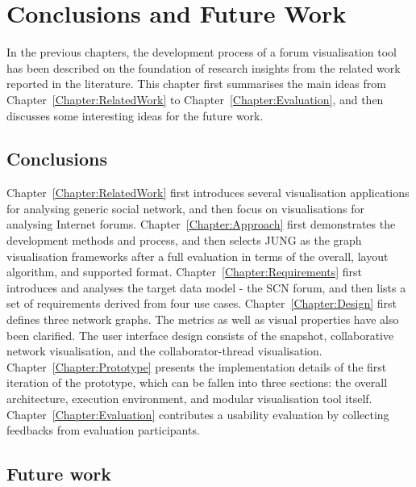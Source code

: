 \chapter{Conclusions and Future Work} \label{Chapter:Conclusions}

In the previous chapters, the development process of a forum visualisation tool has been described on the foundation of research insights from the related work reported in the literature. This chapter first summarises the main ideas from Chapter~\ref{Chapter:RelatedWork} to Chapter~\ref{Chapter:Evaluation}, and then discusses some interesting ideas for the future work.

\section{Conclusions}

Chapter~\ref{Chapter:RelatedWork} first introduces several visualisation applications for analysing generic social network, and then focus on visualisations for analysing Internet forums. Chapter~\ref{Chapter:Approach} first demonstrates the development methods and process, and then selects JUNG as the graph visualisation frameworks after a full evaluation in terms of the overall, layout algorithm, and supported format. Chapter~\ref{Chapter:Requirements} first introduces and analyses the target data model - the SCN forum, and then lists a set of requirements derived from four use cases. Chapter~\ref{Chapter:Design} first defines three network graphs. The metrics as well as visual properties have also been clarified. The user interface design consists of the snapshot, collaborative network visualisation, and the collaborator-thread visualisation. Chapter~\ref{Chapter:Prototype} presents the implementation details of the first iteration of the prototype, which can be fallen into three sections: the overall architecture, execution environment, and modular visualisation tool itself. Chapter~\ref{Chapter:Evaluation} contributes a usability evaluation by collecting feedbacks from evaluation participants.

\section{Future work}

